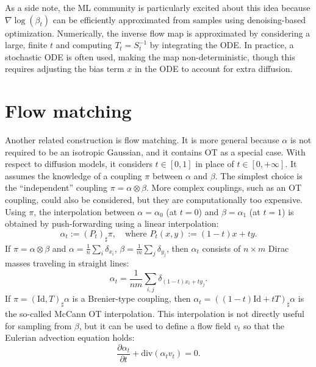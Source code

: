 \documentclass{article}
\begin{document}
As a side note, the ML community is particularly excited about this idea because $\nabla \log(\beta_t)$ can be efficiently approximated from samples using denoising-based optimization. Numerically, the inverse flow map is approximated by considering a large, finite $t$ and computing $T_t = S_t^{-1}$ by integrating the ODE. In practice, a stochastic ODE is often used, making the map non-deterministic, though this requires adjusting the bias term $x$ in the ODE to account for extra diffusion.

\section{Flow matching}

Another related construction is flow matching. It is more general because $\alpha$ is not required to be an isotropic Gaussian, and it contains OT as a special case. 
%
With respect to diffusion models, it considers $t \in [0,1]$ in place of $t \in [0,+\infty]$.
%
It assumes the knowledge of a coupling $\pi$ between $\alpha$ and $\beta$. The simplest choice is the ``independent'' coupling $\pi = \alpha \otimes \beta$. More complex couplings, such as an OT coupling, could also be considered, but they are computationally too expensive. Using $\pi$, the interpolation between $\alpha = \alpha_0$ (at $t=0$) and $\beta = \alpha_1$ (at $t=1$) is obtained by push-forwarding using a linear interpolation:
\begin{equation}
    \alpha_t := (P_t)_\sharp \pi, \quad \text{where } P_t(x, y) := (1-t)x + ty. \label{eq:interp-coupling}
\end{equation}
If $\pi = \alpha \otimes \beta$ and $\alpha = \frac{1}{n} \sum_i \delta_{x_i}$, $\beta = \frac{1}{m} \sum_j \delta_{y_j}$, then $\alpha_t$ consists of $n \times m$ Dirac masses traveling in straight lines:
\begin{equation}
    \alpha_t = \frac{1}{nm} \sum_{i,j} \delta_{(1-t)x_i + ty_j}.
\end{equation}
If $\pi = (\mathrm{Id}, T)_\sharp \alpha$ is a Brenier-type coupling, then $\alpha_t = ((1-t)\mathrm{Id} + tT)_\sharp \alpha$ is the so-called McCann OT interpolation.
%
This interpolation is not directly useful for sampling from $\beta$, but it can be used to define a flow field $v_t$ so that the Eulerian advection equation holds:
\begin{equation}
    \frac{\partial \alpha_t}{\partial t} + \mathrm{div}(\alpha_t v_t) = 0. \label{eq:eulerian-advection}
\end{equation}
\end{document}
